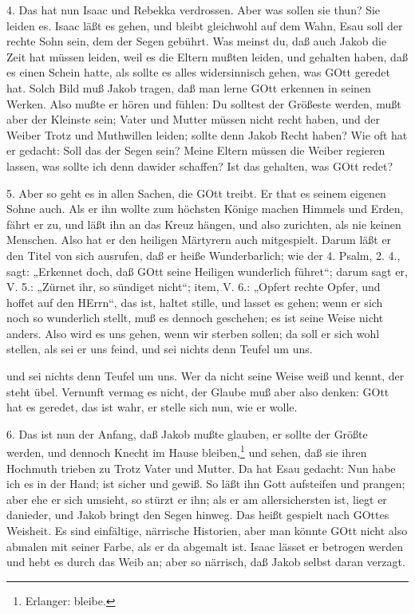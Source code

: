 4. Das hat nun Isaac und Rebekka verdrossen. Aber was sollen sie thun? Sie leiden es. Isaac läßt es gehen, und bleibt gleichwohl auf dem Wahn, Esau soll der rechte Sohn sein, dem der Segen gebührt. Was meinst du, daß auch Jakob die Zeit hat müssen leiden, weil es die Eltern mußten leiden, und gehalten haben, daß es einen Schein hatte, als sollte es alles widersinnisch gehen, was GOtt geredet hat. Solch Bild muß Jakob tragen, daß man lerne GOtt erkennen in seinen Werken. Also mußte er hören und fühlen: Du solltest der Größeste werden, mußt aber der Kleinste sein; Vater und Mutter müssen nicht recht haben, und der Weiber Trotz und Muthwillen leiden; sollte denn Jakob Recht haben? Wie oft hat er gedacht: Soll das der Segen sein? Meine Eltern müssen die Weiber regieren lassen, was sollte ich denn dawider schaffen? Ist das gehalten, was GOtt redet?

5. Aber so geht es in allen Sachen, die GOtt treibt. Er that es seinem eigenen Sohne auch. Als er ihn wollte zum höchsten Könige machen Himmels und Erden, fährt er zu, und läßt ihn an das Kreuz hängen, und also zurichten, als nie keinen Menschen. Also hat er den heiligen Märtyrern auch mitgespielt. Darum läßt er den Titel von sich ausrufen, daß er heiße Wunderbarlich; wie der 4. Psalm, 2. 4., sagt: „Erkennet doch, daß GOtt seine Heiligen wunderlich führet“; darum sagt er, V. 5.: „Zürnet ihr, so sündiget nicht“; item, V. 6.: „Opfert rechte Opfer, und hoffet auf den HErrn“, das ist, haltet stille, und lasset es gehen; wenn er sich noch so wunderlich stellt, muß es dennoch geschehen; es ist seine Weise nicht anders. Also wird es uns gehen, wenn wir sterben sollen; da soll er sich wohl stellen, als sei er uns feind, und sei nichts denn Teufel um uns.

und sei nichts denn Teufel um uns. Wer da nicht seine Weise weiß und kennt, der steht übel. Vernunft vermag es nicht, der Glaube muß aber also denken: GOtt hat es geredet, das ist wahr, er stelle sich nun, wie er wolle.

6. Das ist nun der Anfang, daß Jakob mußte glauben, er sollte der Größte werden, und dennoch Knecht im Hause bleiben,\footnote{Erlanger: bleibe.} und sehen, daß sie ihren Hochmuth trieben zu Trotz Vater und Mutter. Da hat Esau gedacht: Nun habe ich es in der Hand; ist sicher und gewiß. So läßt ihn Gott aufsteifen und prangen; aber ehe er sich umsieht, so stürzt er ihn; als er am allersichersten ist, liegt er danieder, und Jakob bringt den Segen hinweg. Das heißt gespielt nach GOttes Weisheit. Es sind einfältige, närrische Historien, aber man könnte GOtt nicht also abmalen mit seiner Farbe, als er da abgemalt ist. Isaac lässet er betrogen werden und hebt es durch das Weib an; aber so närrisch, daß Jakob selbst daran verzagt.

